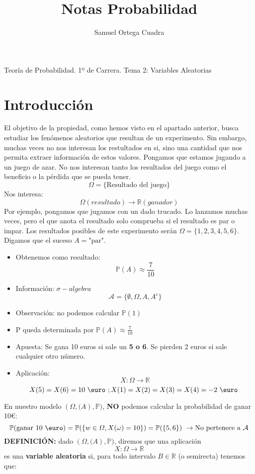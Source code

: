 \documentclass[11pt]{article}
\title{Notas Probabilidad}
\author{Samuel Ortega Cuadra}
\newcommand{\R}{\mathbb{R}}
\newcommand{\prob}{\mathbb{P}}
\newcommand{\OMG}{\varOmega}
\theoremstyle{plain}
\begin{document}
    \begin{center}
        \huge{Teoría de Probabilidad. 1º de Carrera. Tema 2: Variables Aleatorias}
    \end{center}
    \tableofcontents
    \newpage
    \section{Introducción} %
    \label{sec:introducción}
        El objetivo de la propiedad, como hemos visto en el apartado anterior, busca estudiar los fenómenos aleatorios que resultan de un experimento. Sin embargo, muchas veces no nos interesan los restultados en si, sino una cantidad que nos permita extraer información de estos valores. Pongamos que estamos jugando a un juego de azar. No nos interesan tanto los resultados del juego como el beneficio o la pérdida que se pueda tener.
        \[\OMG = \{\text{Resultado del juego}\}\]
        Nos interesa: \[\OMG (resultado) \rightarrow \R(ganador) \]
        Por ejemplo, pongamos que jugamos con un dado trucado. Lo lanzamos muchas veces, pero el que anota el resultado solo comprueba si el resultado es par o impar. Los resultados posibles de este experimento serán $\OMG = \{1,2,3,4,5,6\}$. Digamos que el suceso $A = \text{"par"}$. 
        \begin{itemize}
            \item Obtenemos como resultado: \[\prob(A) \approx \frac{7}{10}\]
            \item Información: $\sigma-algebra$ \[\mathcal{A} = \{\emptyset, \OMG, A, A^c\}\]
            \item Observación: no podemos calcular $\prob(1)$
            \item P queda determinada por $\prob(A) \approx \frac{7}{10}$
            \item Apuesta: Se gana 10 euros si sale un \textbf{5 o 6}. Se pierden 2 euros si sale cualquier otro número.
            \item Aplicación:\[X : \OMG \rightarrow \R\]
            \[X(5) = X(6) = 10\text{ \euro }; X(1) = X(2) = X(3) = X(4) = -2 \text{ \euro }\]
        \end{itemize}
        En nuestro modelo $(\OMG,\mathcal(A),\prob)$, \textbf{NO} podemos calcular la probabilidad de ganar 10\euro:
        \[\prob(\text{ganar 10 \euro}) = \prob(\{w\in\OMG,X(\omega) = 10\}) = \prob(\{5,6\})\ \rightarrow \text{No pertenece a $\mathcal{A}$}\]
        \textbf{DEFINICIÓN:} dado $(\OMG,\mathcal(A),\prob)$, diremos que una aplicación \[X : \OMG \rightarrow \R\] es una \textbf{variable aleatoria} si, para todo intervalo $B\in\R$ (o semirecta) tenemos que:
\end{document}
